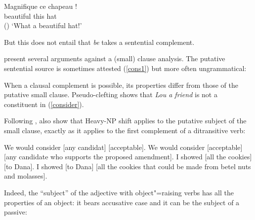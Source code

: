 \ea
\gll Magnifique ce chapeau !\\
     beautiful this hat\\\hfill{()}
\glt `What a beautiful hat!'
\z

\noindent
But this does not entail that \emph{be} takes a sentential complement. 




\citet[Chapter~3]{PollardandSag1994} present several arguments against a (small) clause analysis. The putative sentential source is sometimes attested (\ref{cons1}) but more often ungrammatical:

	
\eal
{}
\zl

	
When a clausal complement is possible, its properties differ from those of the putative small clause. Pseudo-clefting shows that \textit{Lou a friend} is not a constituent in (\ref{consider}).

\eal
{}
\zl

Following \citet{Bresnan1982}\addpages, \citet[113]{PollardandSag1994} also show that Heavy-NP shift
applies to the putative subject of the small clause, exactly as it applies to the first complement
of a ditransitive verb:

\eal
\ex We would consider [any candidat] [acceptable].
\ex We would consider [acceptable]  [any candidate who supports the proposed amendment].
\ex I showed [all the cookies] [to Dana].
\ex I showed [to Dana]  [all the cookies that could be made from betel nuts and molasses].  
\zl

Indeed, the ``subject'' of the adjective with object"=raising verbs has all the properties of an
object: it bears accusative case and it can be the subject of a passive:

